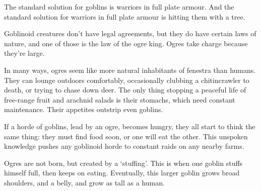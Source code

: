 \begin{multicols}{2}


\noindent
The standard solution for goblins is warriors in full plate armour.
And the standard solution for warriors in full plate armour is hitting them with a tree.

Goblinoid creatures don't have legal agreements, but they do have certain laws of nature, and one of those is the law of the ogre king.
Ogres take charge because they're large.

In many ways, ogres seem like more natural inhabitants of \gls{fenestra} than humans.
They can lounge outdoors comfortably, occasionally clubbing a chitincrawler to death, or trying to chase down deer.
The only thing stopping a peaceful life of free-range fruit and arachnid salads is their stomachs, which need constant maintenance.
Their appetites outstrip even goblins.

If a horde of goblins, lead by an ogre, becomes hungry, they all start to think the same thing: they must find food soon, or one will eat the other.
This unspoken knowledge pushes any goblinoid horde to constant raids on any nearby farms.

Ogres are not born, but created by a `stuffing'.
This is when one goblin stuffs himself full, then keeps on eating.
Eventually, this larger goblin grows broad shoulders, and a belly, and grow as tall as a human.


\end{multicols}

